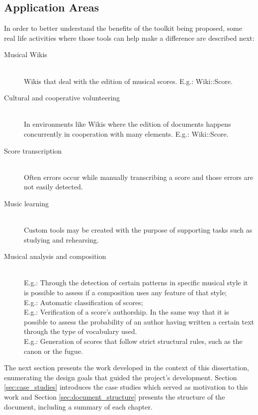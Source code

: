 \subsection*{Application Areas}

In order to better understand the benefits of the toolkit being proposed, some real life activities
where those tools can help make a difference are described next:

\begin{description}
  \item[Musical Wikis] \hfill \\
    Wikis that deal with the edition of musical scores. E.g.: Wiki::Score.
  \item[Cultural and cooperative volunteering] \hfill \\
    In environments like Wikis where the edition of documents happens concurrently in cooperation
    with many elements. E.g.: Wiki::Score.
  \item[Score transcription] \hfill \\
    Often errors occur while manually transcribing a score and those errors are not easily detected.
  \item[Music learning] \hfill \\
    Custom tools may be created with the purpose of supporting tasks such as studying and
    rehearsing.
  \item[Musical analysis and composition] \hfill \\
    E.g.: Through the detection of certain patterns in specific musical style it is possible to
    assess if a composition uses any feature of that style;\\
    E.g.: Automatic classification of scores;\\
    E.g.: Verification of a score's authorship. In the same way that it is possible to assess the
    probability of an author having written a certain text through the type of vocabulary used.\\
    E.g.: Generation of scores that follow strict structural rules, such as the canon or the fugue.
\end{description}

The next section presents the work developed in the context of this dissertation, enumerating the
design goals that guided the project's development. Section \ref{sec:case_studies} introduces the
case studies which served as motivation to this work and Section \ref{sec:document_structure}
presents the structure of the document, including a summary of each chapter.
